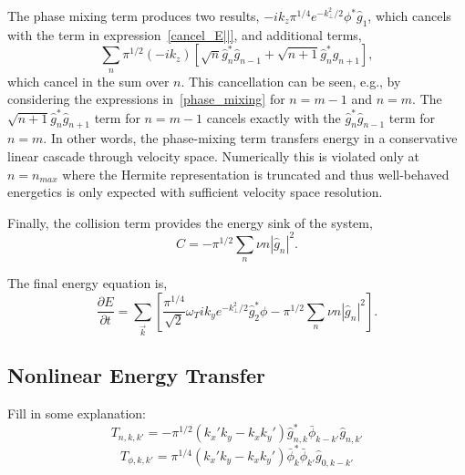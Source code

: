 The phase mixing term produces two results, $-i k_z \pi^{1/4} e^{-k^2_\perp/2}\phi^* \hat{g}_1$, which cancels with the term in expression~\ref{cancel_E||}, and additional terms,
\begin{equation}
\sum_n \pi^{1/2} (-i k_z) \left [ \sqrt{n} \hat{g}^*_n \hat{g}_{n-1} + \sqrt{n+1} \hat{g}^*_n \hat{g}_{n+1} \right ],
\label{phase_mixing}
\end{equation}
which cancel in the sum over $n$.
This cancellation can be seen, e.g., by considering the expressions in~\ref{phase_mixing} for $n=m-1$ and $n=m$.  The $\sqrt{n+1} \hat{g}^*_n \hat{g}_{n+1}$ term for $n=m-1$ cancels exactly with the $\hat{g}^*_n \hat{g}_{n-1}$ term for $n=m$.  In other words, the phase-mixing term transfers energy in a conservative linear cascade through velocity space.  Numerically this is violated only at $n=n_{max}$ where the Hermite representation is truncated and thus well-behaved energetics is only expected with sufficient velocity space resolution. 

Finally, the collision term provides the energy sink of the system,
\begin{equation}
C= -\pi^{1/2} \sum_n \nu n \left | \hat{g}_n \right |^2. 
\end{equation}

The final energy equation is,
\begin{equation}
\frac{\partial E}{\partial t}=\sum_{\vec{k}} [  \frac{\pi^{1/4}}{\sqrt{2}} \omega_T i k_y e^{-k^2_\perp/2}\hat{g}^*_2 \phi  - \pi^{1/2}\sum_n \nu n \left | \hat{g}_n \right |^2    ].
\end{equation}

\subsection{Nonlinear Energy Transfer }

Fill in some explanation:
\begin{equation}
T_{n,k,k'}=-\pi^{1/2}(k_x' k_y-k_xk_y')\hat{g}_{n,k}^*\bar{\phi}_{k-k'}\hat{g}_{n,k'}
\end{equation}
\begin{equation}
T_{\phi,k,k'}=\pi^{1/4}(k_x' k_y-k_xk_y')\bar{\phi}_{k}^*\bar{\phi}_{k'}\hat{g}_{0,k-k'}
\end{equation}

\bigskip
\titlerule \vspace{1pt} \titlerule




